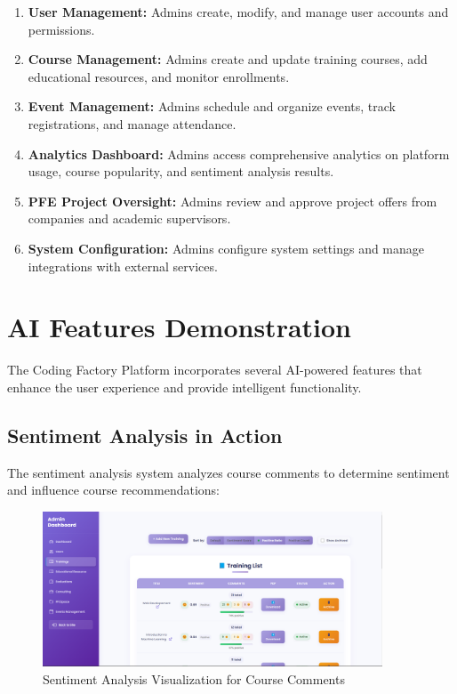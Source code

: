 \documentclass[12pt,a4paper]{report}
\begin{document}
\begin{enumerate}
    \item \textbf{User Management:} Admins create, modify, and manage user accounts and permissions.

    \item \textbf{Course Management:} Admins create and update training courses, add educational resources, and monitor enrollments.

    \item \textbf{Event Management:} Admins schedule and organize events, track registrations, and manage attendance.

    \item \textbf{Analytics Dashboard:} Admins access comprehensive analytics on platform usage, course popularity, and sentiment analysis results.

    \item \textbf{PFE Project Oversight:} Admins review and approve project offers from companies and academic supervisors.

    \item \textbf{System Configuration:} Admins configure system settings and manage integrations with external services.
\end{enumerate}

\section{AI Features Demonstration}

The Coding Factory Platform incorporates several AI-powered features that enhance the user experience and provide intelligent functionality.

\subsection{Sentiment Analysis in Action}

The sentiment analysis system analyzes course comments to determine sentiment and influence course recommendations:

\begin{figure}[!htbp]
\centering
\includegraphics[width=0.9\textwidth]{media/snetiment anlysis.png}
\caption{Sentiment Analysis Visualization for Course Comments}
\label{fig:sentiment-analysis-viz}
\end{figure}
\end{document}
